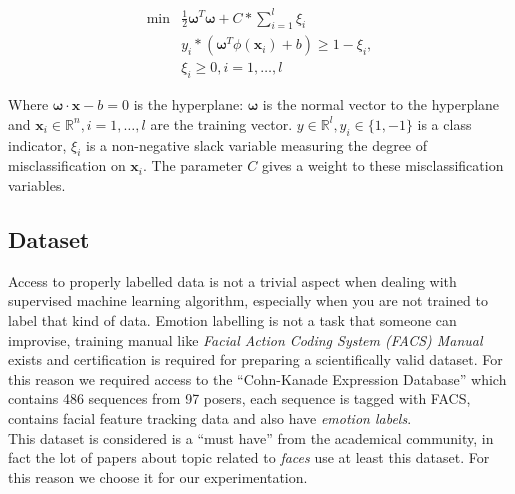 \begin{align}
  \min & \frac{1}{2} \boldsymbol{\omega}^T \boldsymbol{\omega} + C*\sum_{i=1}^l \xi_i\\
  & y_i * (\boldsymbol{\omega}^T \phi(\textbf{x}_i) + b) \geq 1 - \xi_i,\\
  & \xi_i \geq 0, i = 1, \dots, l
  \label{mt:lin_svm}
\end{align}

Where $\boldsymbol{\omega} \cdot \textbf{x} - b = 0$ is the hyperplane:
$\boldsymbol{\omega}$ is the normal vector to the hyperplane and $\textbf{x}_i
\in \mathbb{R}^n, i = 1,\dots,l$ are the training vector.  $y \in \mathbb{R}^l,
y_i \in \{1, -1\}$ is a class indicator, $\xi_i$ is a non-negative slack
variable measuring the degree of misclassification on $\textbf{x}_i$. The
parameter $C$ gives a weight to these misclassification variables.

\subsection{Dataset}

Access to properly labelled data is not a trivial aspect when dealing with supervised machine learning algorithm, especially when you are not trained to label that kind of data. Emotion labelling is not a task that someone can improvise, training manual like \emph{Facial Action Coding System (FACS) Manual} exists and certification is required for preparing a scientifically valid dataset. For this reason we required access to the ``Cohn-Kanade Expression Database''\cite{Kanade2000} which contains 486 sequences from 97 posers, each sequence is tagged with FACS, contains facial feature tracking data and also have \emph{emotion labels}. \\

This dataset is considered is a ``must have'' from the academical community, in fact the lot of papers about topic related to \emph{faces} use at least this dataset. For this reason we choose it for our experimentation. 


